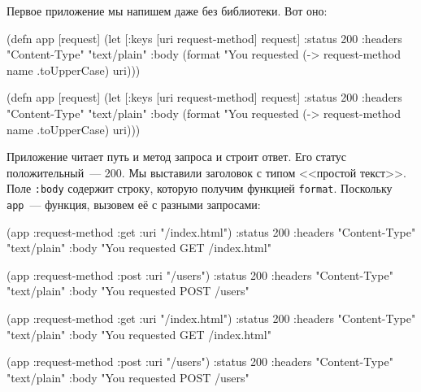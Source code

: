 Первое приложение мы напишем даже без библиотеки. Вот оно:


\label{first-handler}


\ifnarrow

\begin{english}
  \begin{clojure}
(defn app [request]
 (let [{:keys [uri request-method]}
       request]
  {:status 200
   :headers {"Content-Type" "text/plain"}
   :body (format "You requested %
           (-> request-method
               name
               .toUpperCase)
           uri)}))
  \end{clojure}
\end{english}

\else

\begin{english}
  \begin{clojure}
(defn app [request]
  (let [{:keys [uri request-method]} request]
    {:status 200
     :headers {"Content-Type" "text/plain"}
     :body (format "You requested %
                   (-> request-method name .toUpperCase)
                   uri)}))
  \end{clojure}
\end{english}

\fi

Приложение читает путь и метод запроса и строит ответ. Его статус
положительный~--- 200. Мы выставили заголовок с типом <<простой текст>>. Поле
\verb|:body| содержит строку, которую получим функцией \verb|format|. Поскольку
\verb|app|~--- функция, вызовем её с разными запросами:

\ifnarrow

\begin{english}
  \begin{clojure}
(app {:request-method :get
      :uri "/index.html"})
{:status 200
 :headers {"Content-Type" "text/plain"}
 :body "You requested GET /index.html"}

(app {:request-method :post
      :uri "/users"})
{:status 200
 :headers {"Content-Type" "text/plain"}
 :body "You requested POST /users"}
  \end{clojure}
\end{english}

\else

\begin{english}
  \begin{clojure}
(app {:request-method :get :uri "/index.html"})
{:status 200
 :headers {"Content-Type" "text/plain"}
 :body "You requested GET /index.html"}

(app {:request-method :post :uri "/users"})
{:status 200
 :headers {"Content-Type" "text/plain"}
 :body "You requested POST /users"}
  \end{clojure}
\end{english}

